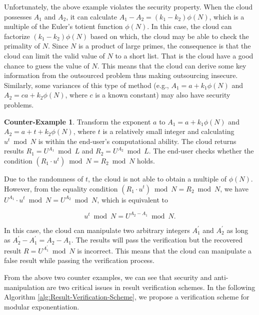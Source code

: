\documentclass[english,draftcls,onecolumn,11pt]{IEEEtran}
\theoremstyle{definition}
\theoremstyle{plain}
\theoremstyle{plain}
\theoremstyle{definition}
\newtheorem{ctexample}{Counter-Example}
\begin{document}
Unfortunately, the above example violates the security property. When
the cloud possesses $A_{1}$ and $A_{2}$, it can calculate $A_{1}-A_{2}=(k_{1}-k_{2})\phi(N)$,
which is a multiple of the Euler's totient function $\phi(N)$. In
this case, the cloud can factorize $(k_{1}-k_{2})\phi(N)$ based on
which, the cloud may be able to check the primality of $N$. Since
$N$ is a product of large primes, the consequence is that the cloud
can limit the valid value of $N$ to a short list. That is the cloud
have a good chance to guess the value of $N$. This means that the
cloud can derive some key information from the outsourced problem
thus making outsourcing insecure. Similarly, some variances of this
type of method (e.g., $A_{1}=a+k_{1}\phi(N)$ and $A_{2}=ca+k_{2}\phi(N)$,
where $c$ is a known constant) may also have security problems.

\begin{ctexample}
Transform the exponent $a$ to $A_1=a+k_1\phi(N)$ and $A_2=a+t+k_2\phi(N)$, where $t$ is a relatively small integer and calculating $u^{t}\bmod N$ is within the end-user's computational ability. The cloud returns results $R_1=U^{A_1}\bmod L$ and $R_2=U^{A_2}\bmod L$. The end-user checks whether the condition $(R_1\cdot u^t)\bmod N=R_2\bmod N$ holds.
\end{ctexample}

Due to the randomness of $t$, the cloud is not able to obtain a multiple
of $\phi(N)$. However, from the equality condition $(R_{1}\cdot u^{t})\bmod N=R_{2}\bmod N$,
we have $U^{A_{1}}\cdot u^{t}\bmod N=U^{A_{2}}\bmod N$, which is
equivalent to 

\[
u^{t}\bmod N=U^{A_{2}-A_{1}}\bmod N.
\]


In this case, the cloud can manipulate two arbitrary integers $A_{1}^{\prime}$
and $A_{2}^{\prime}$ as long as $A_{2}^{\prime}-A_{1}^{\prime}=A_{2}-A_{1}$.
The results will pass the verification but the recovered result $R=U^{A_{1}^{\prime}}\bmod N$
is incorrect. This means that the cloud can manipulate a false result
while passing the verification process.

From the above two counter examples, we can see that security and
anti-manipulation are two critical issues in result verification schemes.
In the following Algorithm \ref{alg:Result-Verification-Scheme},
we propose a verification scheme for modular exponentiation.
\end{document}

